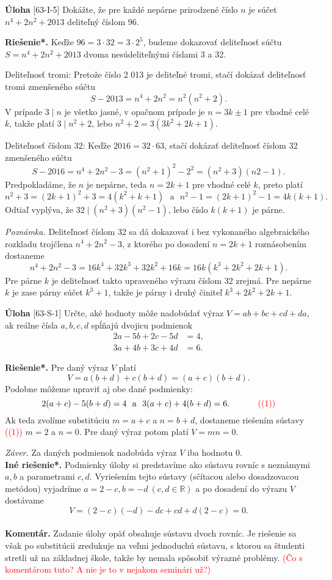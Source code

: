 \documentclass{article}
\newcommand{\RR}{\mathbb{R}}
\newcommand{\kom}{\textbf{Komentár.} }
\newcommand{\rieh}{\textbf{Riešenie*.} }
\newcommand\todo[1]{\noindent\textcolor{red}{(#1)}}
\newcommand{\problem}[3]{
  \begin{tcolorbox}[breakable,notitle,boxrule=0pt,colback=light-gray,colframe=light-gray]
    \textbf{Úloha}
    [#1] #2
  \end{tcolorbox}
  \noindent#3
}
\begin{document}
\problem{63-I-5}{Dokážte, že pre každé nepárne prirodzené číslo $n$ je súčet $n^4 + 2n^2 + 2 013$ deliteľný číslom 96.
}{
\rieh Keďže $96 = 3 \cdot 32 = 3 \cdot 2^5$, budeme dokazovať deliteľnosť súčtu $S = n^4+ 2n^2 + 2 013$ dvoma nesúdeliteľnými číslami 3 a 32.

Deliteľnosť tromi: Pretože číslo 2 013 je deliteľné tromi, stačí dokázať deliteľnosť tromi zmenšeného súčtu
$$S - 2 013 = n^4 + 2n^2= n^2(n^2+ 2).$$
V prípade $3 \mid n$ je všetko jasné, v opačnom prípade je $n = 3k \pm 1$ pre vhodné celé $k$, takže platí $3 \mid n^2 + 2$, lebo $n^2 + 2 = 3(3k^2 + 2k + 1)$.

Deliteľnosť číslom 32: Keďže $2 016 = 32 \cdot 63$, stačí dokázať deliteľnosť číslom 32 zmenšeného súčtu
$$S - 2 016 = n^4+ 2n^2 - 3 = (n^2+ 1)^2 - 2^2= (n^2+ 3)(n2 - 1).$$
Predpokladáme, že $n$ je nepárne, teda $n = 2k + 1$ pre vhodné celé $k$, preto platí
$$n^2+ 3 = (2k + 1)^2+ 3 = 4(k^2+ k + 1)\ \ \ \mathrm{a} \ \ \ n^2 - 1 = (2k + 1)^2 - 1 = 4k(k + 1).$$
Odtiaľ vyplýva, že $32 \mid (n^2 + 3)(n^2 - 1)$, lebo číslo $k(k + 1)$ je párne.

\textit{Poznámka.} Deliteľnosť číslom 32 sa dá dokazovať i bez vykonaného algebraického rozkladu trojčlena $n^4 + 2n^2 - 3$, z ktorého po dosadení $n = 2k + 1$ roznásobením dostaneme
$$n^4+ 2n^2 - 3 = 16k^4+ 32k^3+ 32k^2+ 16k = 16k(k^3+ 2k^2+ 2k + 1).$$
Pre párne $k$ je deliteľnosť takto upraveného výrazu číslom 32 zrejmá. Pre nepárne $k$ je zase párny súčet $k^3 + 1$, takže je párny i druhý činiteľ $k^3 + 2k^2 + 2k + 1$.
}


\problem{63-S-1}{
Určte, aké hodnoty môže nadobúdať výraz $V = ab + bc + cd + da$, ak reálne čísla $a,b, c, d$ spĺňajú dvojicu podmienok
\begin{align*}
2a - 5b + 2c - 5d &= 4,\\
3a + 4b + 3c + 4d &= 6.
\end{align*}
}{
\rieh Pre daný výraz $V$ platí $$V = a(b + d) + c(b + d) = (a + c)(b + d).$$
Podobne môžeme upraviť aj obe dané podmienky: $$2(a + c) - 5(b + d) = 4 \ \ \mathrm{a} \ \  3(a + c) + 4(b + d) = 6.\ \ \  \ \ \ \ \ \ \ \todo{(1)}$$
Ak teda zvolíme substitúciu $m = a + c$ a $n = b + d$, dostaneme riešením sústavy \todo{(1)} $m = 2$ a $n = 0$. Pre daný výraz potom platí $V = mn = 0$.

\textit{Záver.} Za daných podmienok nadobúda výraz $V$ iba hodnotu 0.\\

\textbf{Iné riešenie*.} Podmienky úlohy si predstavíme ako sústavu rovníc s neznámymi $a, b$ a parametrami $c, d$. Vyriešením tejto sústavy (sčítacou alebo dosadzovacou metódou) vyjadríme $a = 2 - c, b = -d \ (c, d \in \RR )$ a po dosadení do výrazu $V$ dostávame $$V = (2 - c)(-d) - dc + cd + d(2 - c) = 0.$$
\\
\kom Zadanie úlohy opäť obsahuje sústavu dvoch rovníc. Je riešenie sa však po substitúcii zredukuje na veľmi jednoduchú sústavu, s ktorou sa študenti stretli už na základnej škole, takže by nemala spôsobiť výrazné problémy. 
\todo{Čo s komentárom tuto? A nie je to v nejakom seminári už?}
}
\end{document}
